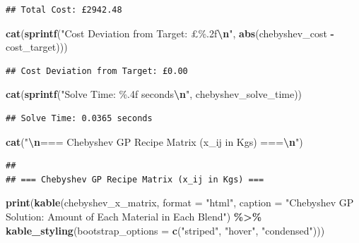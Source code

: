 \documentclass[
]{article}
\newenvironment{Shaded}{\begin{snugshade}}{\end{snugshade}}
\newcommand{\AttributeTok}[1]{\textcolor[rgb]{0.13,0.29,0.53}{#1}}
\newcommand{\FunctionTok}[1]{\textcolor[rgb]{0.13,0.29,0.53}{\textbf{#1}}}
\newcommand{\NormalTok}[1]{#1}
\newcommand{\SpecialCharTok}[1]{\textcolor[rgb]{0.81,0.36,0.00}{\textbf{#1}}}
\newcommand{\StringTok}[1]{\textcolor[rgb]{0.31,0.60,0.02}{#1}}
\begin{document}
\begin{verbatim}
## Total Cost: £2942.48
\end{verbatim}

\begin{Shaded}
\begin{Highlighting}[]
\FunctionTok{cat}\NormalTok{(}\FunctionTok{sprintf}\NormalTok{(}\StringTok{"Cost Deviation from Target: £\%.2f}\SpecialCharTok{\textbackslash{}n}\StringTok{"}\NormalTok{, }\FunctionTok{abs}\NormalTok{(chebyshev\_cost }\SpecialCharTok{{-}}\NormalTok{ cost\_target)))}
\end{Highlighting}
\end{Shaded}

\begin{verbatim}
## Cost Deviation from Target: £0.00
\end{verbatim}

\begin{Shaded}
\begin{Highlighting}[]
\FunctionTok{cat}\NormalTok{(}\FunctionTok{sprintf}\NormalTok{(}\StringTok{"Solve Time: \%.4f seconds}\SpecialCharTok{\textbackslash{}n}\StringTok{"}\NormalTok{, chebyshev\_solve\_time))}
\end{Highlighting}
\end{Shaded}

\begin{verbatim}
## Solve Time: 0.0365 seconds
\end{verbatim}

\begin{Shaded}
\begin{Highlighting}[]
\FunctionTok{cat}\NormalTok{(}\StringTok{"}\SpecialCharTok{\textbackslash{}n}\StringTok{=== Chebyshev GP Recipe Matrix (x\_ij in Kgs) ===}\SpecialCharTok{\textbackslash{}n}\StringTok{"}\NormalTok{)}
\end{Highlighting}
\end{Shaded}

\begin{verbatim}
## 
## === Chebyshev GP Recipe Matrix (x_ij in Kgs) ===
\end{verbatim}

\begin{Shaded}
\begin{Highlighting}[]
\FunctionTok{print}\NormalTok{(}\FunctionTok{kable}\NormalTok{(chebyshev\_x\_matrix, }\AttributeTok{format =} \StringTok{"html"}\NormalTok{, }
            \AttributeTok{caption =} \StringTok{"Chebyshev GP Solution: Amount of Each Material in Each Blend"}\NormalTok{) }\SpecialCharTok{\%\textgreater{}\%}
      \FunctionTok{kable\_styling}\NormalTok{(}\AttributeTok{bootstrap\_options =} \FunctionTok{c}\NormalTok{(}\StringTok{"striped"}\NormalTok{, }\StringTok{"hover"}\NormalTok{, }\StringTok{"condensed"}\NormalTok{)))}
\end{Highlighting}
\end{Shaded}
\end{document}

